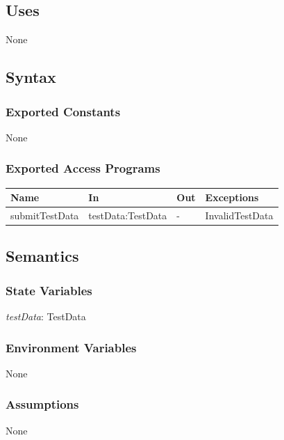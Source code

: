 \documentclass[12pt, titlepage]{article}
\begin{document}
\subsection{Uses}

None

\subsection{Syntax}

\subsubsection{Exported Constants}

None

\subsubsection{Exported Access Programs}

\begin{center}
\begin{tabular}{p{4cm} p{3cm} p{2cm} p{3cm}}
\hline
\textbf{Name} & \textbf{In} & \textbf{Out} & \textbf{Exceptions} \\
\hline
submitTestData & testData:TestData & - & InvalidTestData \\
\hline
\end{tabular}
\end{center}

\subsection{Semantics}

\subsubsection{State Variables}

\textit{testData}: TestData

\subsubsection{Environment Variables}

None

\subsubsection{Assumptions}

None
\end{document}
